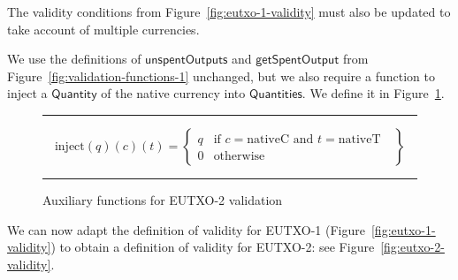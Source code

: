 \documentclass[a4paper]{article}
\newcommand{\s}{\textsf}  %
\newcommand{\msf}[1]{\ensuremath{\mathsf{#1}}}
\newcommand\rfskip{7pt}
\newenvironment{ruledfigure}[1]{\begin{figure}[#1]\hrule\vspace{\rfskip}}{\vspace{\rfskip}\hrule\end{figure}}
\newcommand{\getSpent}{\msf{getSpentOutput}}
\newcommand{\unspent}{\msf{unspentOutputs}}
\newcommand{\qty}{\ensuremath{\s{Quantity}}}
\newcommand{\nativeCur}{\ensuremath{\mathrm{nativeC}}}
\newcommand{\nativeTok}{\ensuremath{\mathrm{nativeT}}}
\newcommand{\injectNative}{\ensuremath{\mathrm{inject}}}
\newcommand{\qtymap}{\ensuremath{\s{Quantities}}}
\begin{document}
\bigskip
\noindent The validity conditions from
Figure~\ref{fig:eutxo-1-validity} must also be updated to take account
of multiple currencies.

We use the definitions of \unspent{}  and
\getSpent{} from Figure~\ref{fig:validation-functions-1} unchanged,
but we also require a function to inject a \qty{} of the native currency
into \qtymap{}. We define it in Figure~\ref{fig:validation-functions-2}.
\begin{displaymath}
\end{displaymath}
\begin{ruledfigure}{H}
  \begin{displaymath}
    \injectNative(q)(c)(t) = \left\{
    \begin{array}{ll}
      q & \mbox{if $c = \nativeCur$ and $t = \nativeTok$ }\\
      0 & \mbox{otherwise}
    \end{array}
    \right\}
  \end{displaymath}
  \caption{Auxiliary functions for EUTXO-2 validation}
  \label{fig:validation-functions-2}
\end{ruledfigure}

We can now adapt the definition of validity for EUTXO-1
(Figure~\ref{fig:eutxo-1-validity}) to obtain a definition of validity for
EUTXO-2: see Figure~\ref{fig:eutxo-2-validity}.
\end{document}
